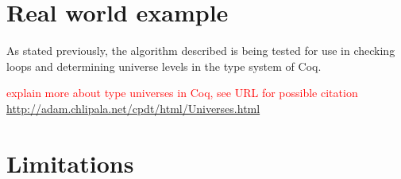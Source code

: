 \section{Real world example}
\label{sec:real_world_example}

As stated previously, the algorithm described  is being
tested for use in checking loops and determining universe levels in the
type system of Coq.

\textcolor{red}{explain more about type universes in Coq, see URL for possible citation}
\url{http://adam.chlipala.net/cpdt/html/Universes.html}

\section{Limitations}
\label{sec:limitations}
